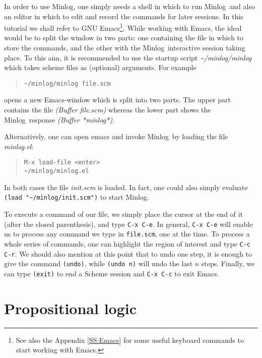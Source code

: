 \documentclass[12pt]{amsart}
\newcommand{\mi}{Minlog}
\newcommand{\mdir}{\~{}/minlog}
\begin{document}
In order to use \mi, one simply needs a shell in which to run \mi\ and
also an editor in which to edit and record the commands for later
sessions.  In this tutorial we shall refer to GNU Emacs\footnote{See
  also the Appendix \ref{SS:Emacs} for some useful keyboard commands
  to start working with Emacs.}.  While working with Emacs, the ideal
would be to split the window in two parts: one containing the file in
which to store the commands, and the other with the \mi\ interactive
session taking place.  To this aim, it is recommended to use the
startup script \emph{\mdir/minlog} which takes scheme files as
(optional) arguments. For example
\begin{quote}
  \texttt{\mdir/minlog file.scm}
\end{quote}
opens a new Emacs-window which is split into two parts.  The upper
part contains the file  \emph{(Buffer file.scm)} whereas the lower part
shows the \mi\ response \emph{(Buffer *minlog*)}.

Alternatively, one can open emacs and invoke \mi\ by loading the file
\emph{minlog.el}:
\begin{quote}
  \texttt{M-x load-file <enter>}\\
  \texttt{\mdir/minlog.el}
\end{quote}
In both cases the file \emph{init.scm} is loaded. In fact, one could
also simply evaluate \texttt{(load "\mdir/init.scm")} to start \mi.

To execute a command of our file, we simply place the cursor
at the end of it (after the closed parenthesis), and type
\texttt{C-x C-e}.  In general, \texttt{C-x C-e} will
enable us to process  any command we type in
\texttt{file.scm}, one at the time.  To process a whole
series of commands, one can  highlight the region of interest and
type \texttt{C-c C-r}.  We should also mention at this
point that to undo one step, it is enough  to give the command
\texttt{(undo)}, while \texttt{(undo n)} will undo  the last $n$
steps.  Finally, we can type  \texttt{(exit)} to end a Scheme
session and  \texttt{C-x C-c} to exit Emacs.


\section{Propositional logic}
\end{document}
